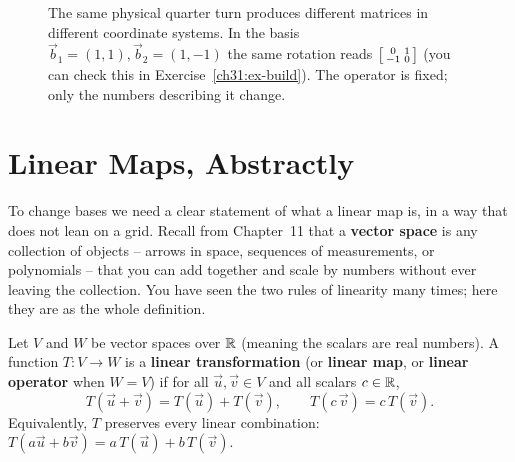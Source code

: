 \begin{figure}[H]
\caption{The same physical quarter turn produces different matrices in different
coordinate systems. In the basis $\vec{b}_1=(1,1),\vec{b}_2=(1,-1)$ the same
rotation reads $\protect\begin{bsmallmatrix}0&1\\-1&0\protect\end{bsmallmatrix}$
(you can check this in Exercise~\ref{ch31:ex-build}). The operator is fixed;
only the numbers describing it change.}
\label{ch31:fig-operator-vs-matrix}
\end{figure}

\section{Linear Maps, Abstractly}
\label{ch31:linear-maps}

To change bases we need a clear statement of what a linear map
is, in a way that does not lean on a grid. Recall from Chapter~11 that a \textbf{vector space} is any
collection of objects -- arrows in space, sequences of measurements, or polynomials --
that you can add together and scale by numbers without ever leaving the collection.
You have seen the two rules of linearity many times; here they are as the whole
definition.

\begin{definition}
\label{ch31:def-linear}
Let $V$ and $W$ be vector spaces over $\mathbb{R}$ (meaning the scalars are real
numbers). A function $T:V\to W$ is a
\textbf{linear transformation} (or \textbf{linear map}, or \textbf{linear
operator} when $W=V$) if for all $\vec{u},\vec{v}\in V$ and all scalars
$c\in\mathbb{R}$,
\[
  T(\vec{u}+\vec{v}) = T(\vec{u}) + T(\vec{v}),
  \qquad
  T(c\,\vec{v}) = c\,T(\vec{v}).
\]
Equivalently, $T$ preserves every linear combination:
$T(a\vec{u}+b\vec{v}) = a\,T(\vec{u}) + b\,T(\vec{v})$.
\end{definition}

